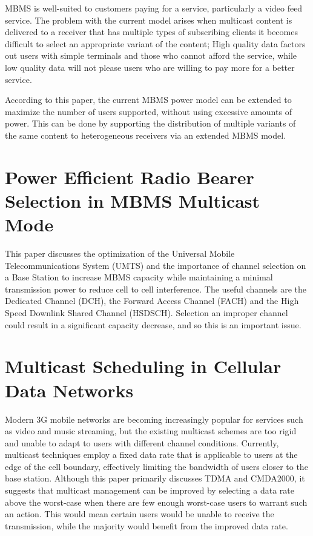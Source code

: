 \documentclass[11pt]{article}
\begin{document}
MBMS is well-suited to customers paying for a service, particularly a
video feed service. The problem with the current model arises when
multicast content is delivered to a receiver that has multiple types
of subscribing clients it becomes difficult to select an appropriate
variant of the content; High quality data factors out users with
simple terminals and those who cannot afford the service, while low
quality data will not please users who are willing to pay more for a
better service.

According to this paper, the current MBMS power model can be extended
to maximize the number of users supported, without using excessive
amounts of power. This can be done by supporting the distribution of
multiple variants of the same content to heterogeneous receivers via
an extended MBMS model.


\section{Power Efficient Radio Bearer Selection in MBMS Multicast Mode}
\label{sec-5}


This paper discusses the optimization of the Universal Mobile
Telecommunications System (UMTS) and the importance of channel
selection on a Base Station to increase MBMS capacity while
maintaining a minimal transmission power to reduce cell to cell
interference. The useful channels are the Dedicated Channel (DCH), the
Forward Access Channel (FACH) and the High Speed Downlink Shared
Channel (HSDSCH). Selection an improper channel could result in a
significant capacity decrease, and so this is an important issue.


\section{Multicast Scheduling in Cellular Data Networks}
\label{sec-6}


Modern 3G mobile networks are becoming increasingly popular for
services such as video and music streaming, but the existing multicast
schemes are too rigid and unable to adapt to users with different
channel conditions. Currently, multicast techniques employ a fixed
data rate that is applicable to users at the edge of the cell
boundary, effectively limiting the bandwidth of users closer to the
base station. Although this paper primarily discusses TDMA and
CMDA2000, it suggests that multicast management can be improved by
selecting a data rate above the worst-case when there are few enough
worst-case users to warrant such an action. This would mean certain
users would be unable to receive the transmission, while the majority
would benefit from the improved data rate.
\end{document}
